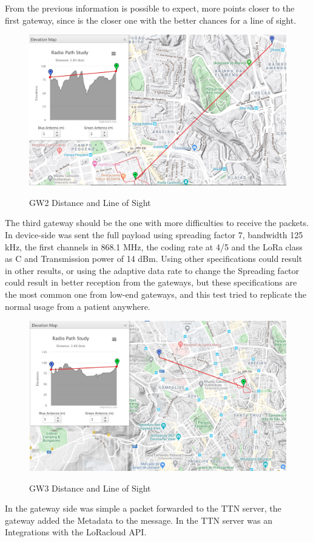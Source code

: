 From the previous information is possible to expect, more points closer to the first gateway, since is the closer one with the better chances for a line of sight. 
\begin{figure}[htbp]
  \centering
      {\includegraphics[width=0.7\linewidth]{Chapters/Figures/GW2.JPG}}%
  \caption{GW2 Distance and Line of Sight}
    \label{fig:GW2LOS}
\end{figure}

The third gateway should be the one with more difficulties to receive the packets. In device-side was sent the full payload using spreading factor 7, bandwidth 125 kHz, the first channels in 868.1 MHz, the coding rate at 4/5 and the LoRa class as C and Transmission power of 14 dBm. Using other specifications could result in other results, or using the adaptive data rate to change the Spreading factor could result in better reception from the gateways, but these specifications are the most common one from low-end gateways, and this test tried to replicate the normal usage from a patient anywhere.

\begin{figure}[htbp]
  \centering
 {\includegraphics[width=0.7\linewidth]{Chapters/Figures/GW3.JPG}}%
   \caption{GW3 Distance and Line of Sight}
  \label{fig:GW3LOS}
\end{figure}

In the gateway side was simple a packet forwarded to the TTN server, the gateway added the Metadata to the message. In the TTN server was an Integrations with the LoRacloud API.
  
